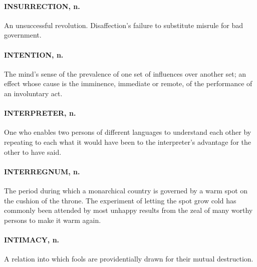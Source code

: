 \documentclass[11pt]{article}
\begin{document}
\paragraph{INSURRECTION, n.}  An unsuccessful revolution.  Disaffection's failure
to substitute misrule for bad government.

\paragraph{INTENTION, n.}  The mind's sense of the prevalence of one set of
influences over another set; an effect whose cause is the imminence,
immediate or remote, of the performance of an involuntary act.

\paragraph{INTERPRETER, n.}  One who enables two persons of different languages to
understand each other by repeating to each what it would have been to
the interpreter's advantage for the other to have said.

\paragraph{INTERREGNUM, n.}  The period during which a monarchical country is
governed by a warm spot on the cushion of the throne.  The experiment
of letting the spot grow cold has commonly been attended by most
unhappy results from the zeal of many worthy persons to make it warm
again.

\paragraph{INTIMACY, n.}  A relation into which fools are providentially drawn for
their mutual destruction.
\end{document}
